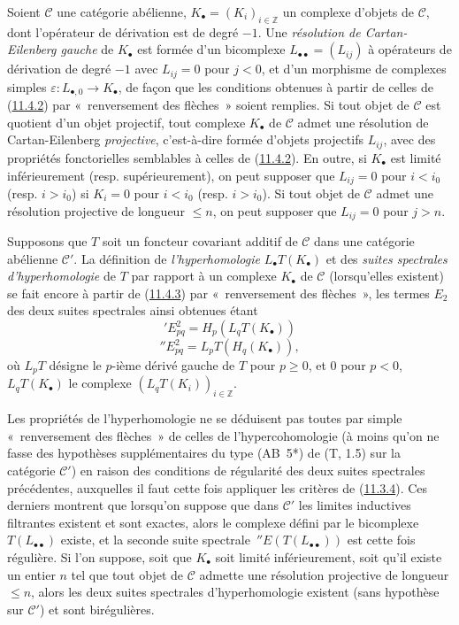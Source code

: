 \begin{env}[11.6.1]
\label{0.11.6.1-fr}
Soient $\mathcal C$ une catégorie abélienne,
$K_\bullet=(K_i)_{i\in\mathbb Z}$ un complexe d'objets de $\mathcal C$, dont
l'opérateur de dérivation est de degré $-1$. Une \emph{résolution de
Cartan-Eilenberg gauche} de $K_\bullet$ est formée d'un bicomplexe
$L_{\bullet\bullet}=(L_{ij})$ à opérateurs de dérivation de degré $-1$ avec
$L_{ij}=0$ pour $j<0$, et d'un morphisme de complexes simples
$\varepsilon:L_{\bullet,0}\to K_\bullet$, de façon que les conditions obtenues
à partir de celles de (\hyperref[0.11.4.2-fr]{11.4.2}) par «~renversement des
flèches~» soient remplies. Si tout objet de $\mathcal C$ est quotient d'un
objet projectif, tout complexe $K_\bullet$ de $\mathcal C$ admet une
résolution de Cartan-Eilenberg \emph{projective}, c'est-à-dire formée d'objets
projectifs $L_{ij}$, avec des propriétés fonctorielles semblables à celles de
(\hyperref[0.11.4.2-fr]{11.4.2}). En outre, si $K_\bullet$ est limité
inférieurement (resp. supérieurement), on peut supposer que $L_{ij}=0$ pour
$i<i_0$ (resp. $i>i_0$) si $K_i=0$ pour $i<i_0$ (resp. $i>i_0$). Si tout
objet de $\mathcal C$ admet une résolution projective de longueur $\leq n$,
on peut supposer que $L_{ij}=0$ pour $j>n$.
\end{env}

\begin{env}[11.6.2]
\label{0.11.6.2-fr}
Supposons que $T$ soit un foncteur covariant additif de $\mathcal C$ dans une
catégorie abélienne $\mathcal C'$. La définition de
\emph{l'hyperhomologie} $L_\bullet T(K_\bullet)$ et des \emph{suites
spectrales d'hyperhomologie} de $T$ par rapport à un complexe $K_\bullet$ de
$\mathcal C$ (lorsqu'elles existent) se fait encore à partir de
(\hyperref[0.11.4.3-fr]{11.4.3}) par «~renversement des flèches~», les termes
$E_2$ des deux suites spectrales ainsi obtenues étant
\[
\label{0.11.6.2.1-fr}
\tag{11.6.2.1}
{}'E^2_{pq}=H_p(L_qT(K_\bullet))
\]
\[
\label{0.11.6.2.2-fr}
\tag{11.6.2.2}
{}''E^2_{pq}=L_pT(H_q(K_\bullet)),
\]
où $L_pT$ désigne le $p$-ième dérivé gauche de $T$ pour $p\geq 0$, et $0$
pour $p<0$, $L_qT(K_\bullet)$ le complexe
$(L_qT(K_i))_{i\in\mathbb Z}$.

Les propriétés de l'hyperhomologie ne se déduisent pas toutes par simple
«~renversement des flèches~» de celles de l'hypercohomologie (à moins qu'on
ne fasse des hypothèses supplémentaires du type (AB~5*) de (T, 1.5) sur la
catégorie $\mathcal C'$) en raison des conditions de régularité des deux
suites spectrales précédentes, auxquelles il faut cette fois appliquer les
critères de (\hyperref[0.11.3.4-fr]{11.3.4}). Ces derniers montrent que
lorsqu'on suppose que dans $\mathcal C'$ les limites inductives filtrantes
existent et sont exactes, alors le complexe défini par le bicomplexe
$T(L_{\bullet\bullet})$ existe, et la seconde suite spectrale
$\,{}''E(T(L_{\bullet\bullet}))$ est cette fois régulière. Si l'on suppose,
soit que $K_\bullet$ soit limité inférieurement, soit qu'il existe un entier
$n$ tel que tout objet de $\mathcal C$ admette une résolution projective de
longueur $\leq n$, alors les deux suites spectrales d'hyperhomologie existent
(sans hypothèse sur $\mathcal C'$) et sont birégulières.
\end{env}

